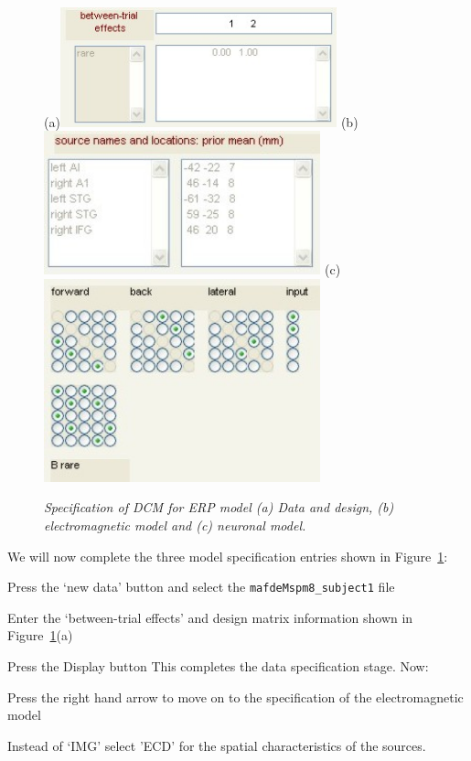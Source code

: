 \begin{figure}
\begin{center}
(a)\includegraphics[width=80mm]{data-and-design}
(b)\includegraphics[width=80mm]{electro-model}
(c)\includegraphics[width=80mm]{neuronal-model}
\caption{\em Specification of DCM for ERP model (a) Data and design, (b) electromagnetic model and (c) neuronal model.
\label{specify} }
\end{center}
\end{figure}
We will now complete the three model specification entries shown in Figure~\ref{specify}:
\bi
\item{Press the `new data' button and select the \texttt{mafdeMspm8\_subject1} file}
\item{Enter the `between-trial effects' and design matrix information shown in Figure~\ref{specify}(a)}
\item{Press the Display button}
\ei
This completes the data specification stage. Now:
\bi
\item{Press the right hand arrow to move on to the specification of the electromagnetic model}
\item{Instead of `IMG' select 'ECD' for the spatial characteristics of the sources.}
